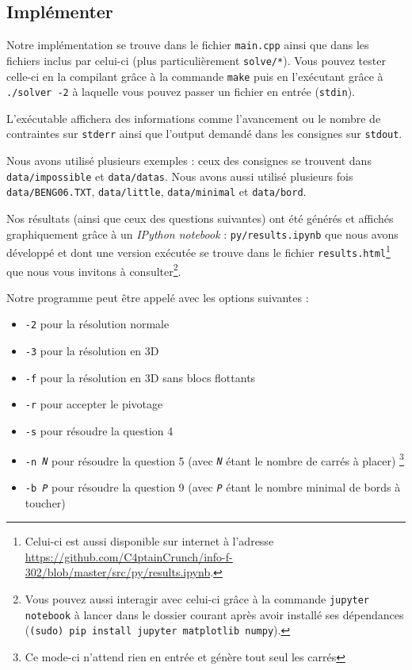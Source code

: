 \documentclass[a4paper]{article}
\begin{document}
\subsection{Implémenter}

Notre implémentation se trouve dans le fichier \texttt{main.cpp} ainsi que dans les fichiers inclus par celui-ci (plus particulièrement \texttt{solve/*}). Vous pouvez tester celle-ci en la compilant grâce à la commande \texttt{make} puis en l'exécutant grâce à \texttt{./solver -2} à laquelle vous pouvez passer un fichier en entrée (\texttt{stdin}).

L'exécutable affichera des informations comme l'avancement ou le nombre de contraintes sur \texttt{stderr} ainsi que l'output demandé dans les consignes sur \texttt{stdout}.

Nous avons utilisé plusieurs exemples : ceux des consignes se trouvent dans \texttt{data/impossible} et \texttt{data/datas}. Nous avons aussi utilisé plusieurs fois \texttt{data/BENG06.TXT}, \texttt{data/little}, \texttt{data/minimal} et \texttt{data/bord}.

Nos résultats (ainsi que ceux des questions suivantes) ont été générés et affichés graphiquement grâce à un \textit{IPython notebook} : \texttt{py/results.ipynb} que nous avons développé et dont une version exécutée se trouve dans le fichier \texttt{results.html}\footnote{Celui-ci est aussi disponible sur internet à l'adresse \url{https://github.com/C4ptainCrunch/info-f-302/blob/master/src/py/results.ipynb}.} que nous vous invitons à consulter\footnote{Vous pouvez aussi interagir avec celui-ci grâce à la commande \texttt{jupyter notebook} à lancer dans le dossier courant après avoir installé ses dépendances (\texttt{(sudo) pip install jupyter matplotlib numpy}).}.

Notre programme peut être appelé avec les options suivantes :
\begin{itemize}
  \item \texttt{-2} pour la résolution normale
  \item \texttt{-3} pour la résolution en 3D
  \item \texttt{-f} pour la résolution en 3D sans blocs flottants
  \item \texttt{-r} pour accepter le pivotage
  \item \texttt{-s} pour résoudre la question 4
  \item \texttt{-n \textit{N}} pour résoudre la question 5 (avec \texttt{\textit{N}} étant le nombre de carrés à placer) \footnote{Ce mode-ci n'attend rien en entrée et génère tout seul les carrés}
  \item \texttt{-b \textit{P}} pour résoudre la question 9 (avec \texttt{\textit{P}} étant le nombre minimal de bords à toucher)
\end{itemize}
\end{document}
